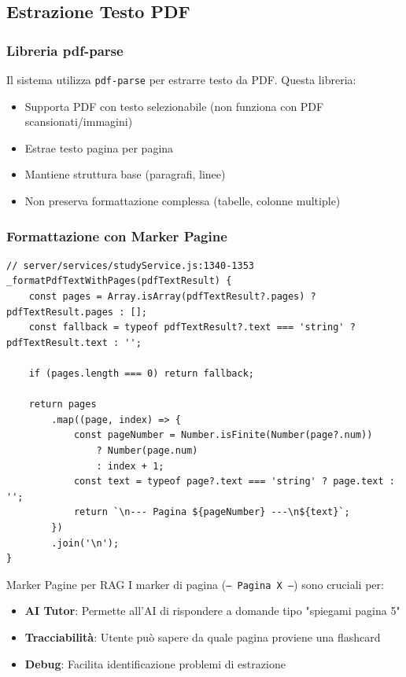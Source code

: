 \documentclass[11pt,a4paper]{article}
\begin{document}
\subsection{Estrazione Testo PDF}

\subsubsection{Libreria pdf-parse}

Il sistema utilizza \texttt{pdf-parse} per estrarre testo da PDF. Questa libreria:
\begin{itemize}
    \item Supporta PDF con testo selezionabile (non funziona con PDF scansionati/immagini)
    \item Estrae testo pagina per pagina
    \item Mantiene struttura base (paragrafi, linee)
    \item Non preserva formattazione complessa (tabelle, colonne multiple)
\end{itemize}

\subsubsection{Formattazione con Marker Pagine}

\begin{lstlisting}[caption=Formattazione Testo con Marker Pagine]
// server/services/studyService.js:1340-1353
_formatPdfTextWithPages(pdfTextResult) {
    const pages = Array.isArray(pdfTextResult?.pages) ? pdfTextResult.pages : [];
    const fallback = typeof pdfTextResult?.text === 'string' ? pdfTextResult.text : '';

    if (pages.length === 0) return fallback;

    return pages
        .map((page, index) => {
            const pageNumber = Number.isFinite(Number(page?.num)) 
                ? Number(page.num) 
                : index + 1;
            const text = typeof page?.text === 'string' ? page.text : '';
            return `\n--- Pagina ${pageNumber} ---\n${text}`;
        })
        .join('\n');
}
\end{lstlisting}

\begin{tipbox}{Marker Pagine per RAG}
I marker di pagina (\texttt{--- Pagina X ---}) sono cruciali per:
\begin{itemize}
    \item \textbf{AI Tutor}: Permette all'AI di rispondere a domande tipo "spiegami pagina 5"
    \item \textbf{Tracciabilità}: Utente può sapere da quale pagina proviene una flashcard
    \item \textbf{Debug}: Facilita identificazione problemi di estrazione
\end{itemize}
\end{tipbox}
\end{document}
